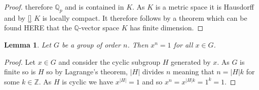 \documentclass{article}
\newtheorem{lemma}{Lemma}[section]
\newcommand{\mbb}[1]{\mathbb{#1}}
\begin{document}
\begin{proof}
    therefore $\mbb Q_p$ and is contained in $K$. As $K$ is a metric space it is Hausdorff and by \ref{} $K$ is locally compact. It therefore follows by a theorem which can be found HERE that the $\mbb Q$-vector space $K$ has finite dimension. 
\end{proof}


\begin{lemma}\label{lem: x^|G| = 1}
    Let $G$ be a group of order $n$. Then $x^n = 1$ for all $x \in G$.
\end{lemma}
\begin{proof}
    Let $x \in G$ and consider the cyclic subgroup $H$ generated by $x$. As $G$ is finite so is $H$ so by Lagrange's theorem, $|H|$ divides $n$ meaning that $n = |H|k$ for some $k \in \mbb Z$. As $H$ is cyclic we have $x^{|H|} = 1$ and so $x^n = x^{|H|k} = 1^k = 1$.
\end{proof}
\end{document}
